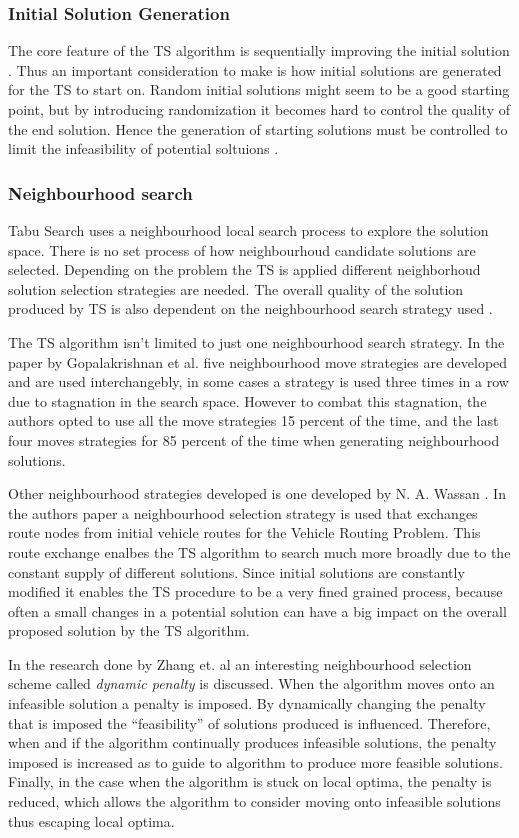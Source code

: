 \subsubsection{Initial Solution Generation}
The core feature of the TS algorithm is sequentially improving the initial solution \cite{TSHazardous}. Thus an important consideration to make is how initial solutions are generated for the TS to start on. Random initial solutions might seem to be a good starting point, but by introducing randomization it becomes hard to control the quality of the end solution. Hence the generation of starting solutions must be controlled to limit the infeasibility of potential soltuions \cite{TSHazardous}.

\subsubsection{Neighbourhood search}
Tabu Search uses a neighbourhood local search process to explore the solution space. There is no set process of how neighbourhoud candidate solutions are selected. Depending on the problem the TS is applied different neighborhoud solution selection strategies are needed. The overall quality of the solution produced by TS is also dependent on the neighbourhood search strategy used \cite{TSHazardous}. 

The TS algorithm isn't limited to just one neighbourhood search strategy. In the paper by Gopalakrishnan et al.\cite{TabuCarryOver} five neighbourhood move strategies are developed and are used interchangebly, in some cases a strategy is used three times in a row due to stagnation in the search space. However to combat this stagnation, the authors opted to use all the move strategies 15 percent of the time, and the last four moves strategies for 85 percent of the time when generating neighbourhood solutions.

Other neighbourhood strategies developed is one developed by N. A. Wassan \cite{ReactiveTabuVHR}. In the authors paper a neighbourhood selection strategy is used that exchanges route nodes from initial vehicle routes for the Vehicle Routing Problem. This route exchange enalbes the TS algorithm to search much more broadly due to the constant supply of different solutions. Since initial solutions are constantly modified it enables the TS procedure to be a very fined grained process, because often a small changes in a potential solution can have a big impact on the overall proposed solution by the TS algorithm.

In the research done by Zhang et. al \cite{TSHazardous} an interesting neighbourhood selection scheme called \emph{dynamic penalty} is discussed. When the algorithm moves onto an infeasible solution a penalty is imposed. By dynamically changing the penalty that is imposed the ``feasibility'' of solutions produced is influenced. Therefore, when and if the algorithm continually produces infeasible solutions, the penalty imposed is increased as to guide to algorithm to produce more feasible solutions. Finally, in the case when the algorithm is stuck on local optima, the penalty is reduced, which allows the algorithm to consider moving onto infeasible solutions thus escaping local optima.

